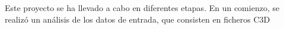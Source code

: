 


\noindent Este proyecto se ha llevado a cabo en diferentes etapas. En un comienzo, se realizó un análisis de los datos de entrada, que consisten en ficheros C3D